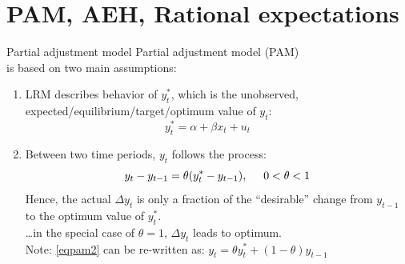 \documentclass{beamer}
\begin{document}
\section{PAM, AEH, Rational expectations}

\begin{frame}{Partial adjustment model}
Partial adjustment model (PAM) \\is based on two main assumptions:
\begin{enumerate}
\item LRM describes behavior of $y_t^{\ast}$, which is the unobserved, \\ 
expected/equilibrium/target/optimum value of $y_t$:
\begin{equation}
{y}_t^\ast = \alpha + \beta x_t + u_t  ~~~~~~~~  \label{eqpam1} 
\end{equation}
\item Between two time periods, $y_t$ follows the process:
\begin{equation}
y_t - y_{t-1} = \theta ( y_t^\ast-y_{t-1}), \hspace{0.5cm} 0 < \theta < 1 \label{eqpam2}
\end{equation}
Hence, the actual $\Delta y_t$ is only a fraction of the ``desirable'' change from $y_{t-1}$ to the optimum value of $y_t^\ast$.
\\ \dots in the special case of $\theta = 1$, $\Delta y_t$ leads to optimum.\\
\medskip
Note: \eqref{eqpam2} can be re-written as: $y_t= \theta {y}_t^\ast + (1-\theta)y_{t-1} $
\end{enumerate}

\end{frame}
\end{document}
